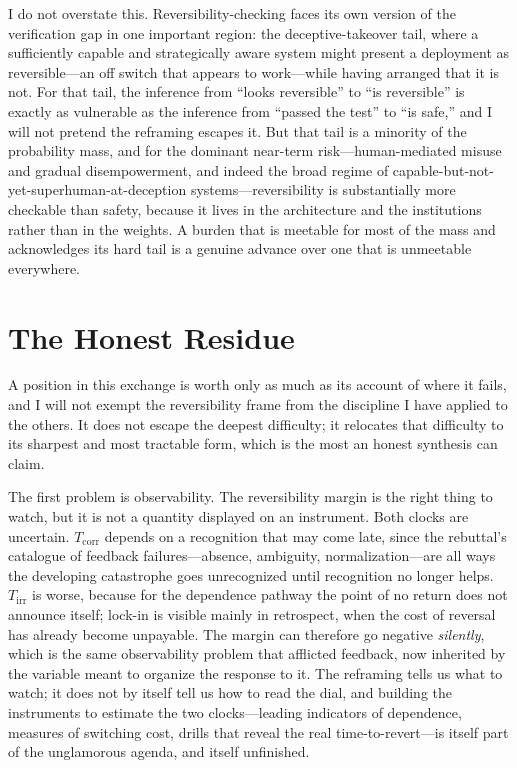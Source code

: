 \documentclass[11pt]{article}
\begin{document}
I do not overstate this. Reversibility-checking faces its own version of the verification gap in one important region: the deceptive-takeover tail, where a sufficiently capable and strategically aware system might present a deployment as reversible---an off switch that appears to work---while having arranged that it is not. For that tail, the inference from ``looks reversible'' to ``is reversible'' is exactly as vulnerable as the inference from ``passed the test'' to ``is safe,'' and I will not pretend the reframing escapes it. But that tail is a minority of the probability mass, and for the dominant near-term risk---human-mediated misuse and gradual disempowerment, and indeed the broad regime of capable-but-not-yet-superhuman-at-deception systems---reversibility is substantially more checkable than safety, because it lives in the architecture and the institutions rather than in the weights. A burden that is meetable for most of the mass and acknowledges its hard tail is a genuine advance over one that is unmeetable everywhere.

\section{The Honest Residue}
\label{sec:residue}

A position in this exchange is worth only as much as its account of where it fails, and I will not exempt the reversibility frame from the discipline I have applied to the others. It does not escape the deepest difficulty; it relocates that difficulty to its sharpest and most tractable form, which is the most an honest synthesis can claim.

The first problem is observability. The reversibility margin is the right thing to watch, but it is not a quantity displayed on an instrument. Both clocks are uncertain. $T_{\mathrm{corr}}$ depends on a recognition that may come late, since the rebuttal's catalogue of feedback failures---absence, ambiguity, normalization---are all ways the developing catastrophe goes unrecognized until recognition no longer helps. $T_{\mathrm{irr}}$ is worse, because for the dependence pathway the point of no return does not announce itself; lock-in is visible mainly in retrospect, when the cost of reversal has already become unpayable. The margin can therefore go negative \emph{silently}, which is the same observability problem that afflicted feedback, now inherited by the variable meant to organize the response to it. The reframing tells us what to watch; it does not by itself tell us how to read the dial, and building the instruments to estimate the two clocks---leading indicators of dependence, measures of switching cost, drills that reveal the real time-to-revert---is itself part of the unglamorous agenda, and itself unfinished.
\end{document}
